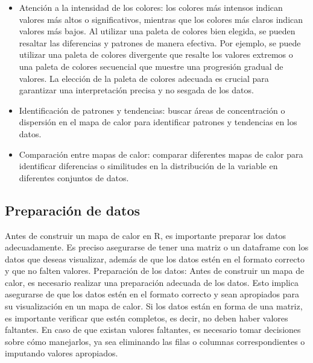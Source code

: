 \documentclass{article}
\begin{document}
\begin{itemize}
\item Atención a la intensidad de los colores: los colores más intensos indican valores más altos o significativos, mientras que los colores más claros indican valores más bajos. Al utilizar una paleta de colores bien elegida, se pueden resaltar las diferencias y patrones de manera efectiva. Por ejemplo, se puede utilizar una paleta de colores divergente que resalte los valores extremos o una paleta de colores secuencial que muestre una progresión gradual de valores. La elección de la paleta de colores adecuada es crucial para garantizar una interpretación precisa y no sesgada de los datos.
\item Identificación de patrones y tendencias: buscar áreas de concentración o dispersión en el mapa de calor para identificar patrones y tendencias en los datos.
\item Comparación entre mapas de calor: comparar diferentes mapas de calor para identificar diferencias o similitudes en la distribución de la variable en diferentes conjuntos de datos.


\end{itemize}



\subsection{Preparación de datos}
Antes de construir un mapa de calor en R, es importante preparar los datos adecuadamente.  Es preciso asegurarse de tener una matriz o un dataframe con los datos que deseas visualizar, además de que los datos estén en el formato correcto y que no falten valores.  Preparación de los datos: Antes de construir un mapa de calor, es necesario realizar una preparación adecuada de los datos. Esto implica asegurarse de que los datos estén en el formato correcto y sean apropiados para su visualización en un mapa de calor. Si los datos están en forma de una matriz, es importante verificar que estén completos, es decir, no deben haber valores faltantes. En caso de que existan valores faltantes, es necesario tomar decisiones sobre cómo manejarlos, ya sea eliminando las filas o columnas correspondientes o imputando valores apropiados.
\end{document}
